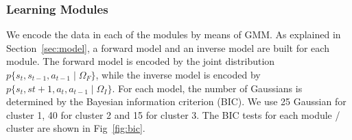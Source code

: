 
\subsubsection{Learning Modules}
\label{sec:module}
We encode the data in each of the modules by means of GMM. As
explained in Section~\ref{sec:model}, a forward model and an inverse
model are built for each module. The forward model is encoded by the
joint distribution $p\{s_t,s_{t-1},a_{t-1}\mid\Omega_F\}$, while the
inverse model is encoded by
$p\{s_t,s{t+1},a_t,a_{t-1}\mid\Omega_I\}$. For each model, the number
of Gaussians is determined by the Bayesian information criterion
(BIC). We use 25 Gaussian for cluster 1, 40 for cluster 2 and 15 for
cluster 3. The BIC tests for each module / cluster are shown in
Fig~\ref{fig:bic}.

